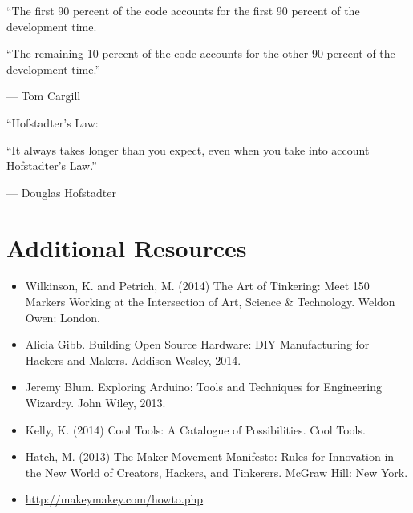 \documentclass{../fal_assignment}
\begin{document}
%

\begin{marginquote}
    ``The first 90 percent of the code accounts for the first 90 percent of the development time.
    
    ``The remaining 10 percent of the code accounts for the other 90 percent of the development time.''
    
    --- Tom Cargill
    
    \marginquoterule
    
    ``Hofstadter's Law:
    
    ``It always takes longer than you expect, even when you take into account Hofstadter's Law.''
    
    --- Douglas Hofstadter
\end{marginquote}
\section*{Additional Resources}

\begin{itemize}
    \item Wilkinson, K. and Petrich, M. (2014) The Art of Tinkering: Meet 150 Markers Working at the Intersection of Art, Science \& Technology. Weldon Owen: London.
    \item Alicia Gibb. Building Open Source Hardware: DIY Manufacturing for Hackers and Makers. Addison Wesley, 2014. 
    \item Jeremy Blum. Exploring Arduino: Tools and Techniques for Engineering Wizardry. John Wiley, 2013. 
    \item Kelly, K. (2014) Cool Tools: A Catalogue of Possibilities. Cool Tools.
    \item Hatch, M. (2013) The Maker Movement Manifesto: Rules for Innovation in the New World of Creators, Hackers, and Tinkerers. McGraw Hill: New York.
    \item \url{http://makeymakey.com/howto.php}
\end{itemize}
\end{document}
